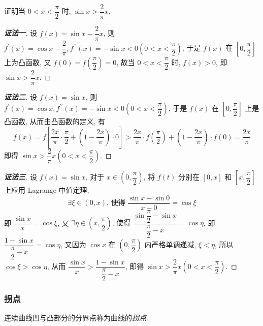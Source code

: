 \begin{example}
    证明当 $0<x<\dfrac{\pi}{2}$ 时, $\sin x>\dfrac{2}{\pi}x.$
\end{example}
\begin{proof}[{\songti \textbf{证法一}}]
    设 $ f(x)=\sin x-\dfrac{2}{\pi} x$, 则 $ f^{\prime}(x)=\cos x-\dfrac{2}{\pi}, f^{\prime \prime}(x)=-\sin x<0\left(0<x<\dfrac{\pi}{2}\right)$, 于是
    $f(x) $ 在 $ \left[0, \dfrac{\pi}{2}\right] $ 上为凸函数, 又 $ f(0)=f\left(\dfrac{\pi}{2}\right)=0$, 故当 $ 0<x<\dfrac{\pi}{2} $ 时, $f(x)>0$, 即 $ \sin x>\dfrac{2}{\pi} x. $
\end{proof}
\begin{proof}[{\songti \textbf{证法二}}]
    设 $ f(x)=\sin x$, 则 $ f^{\prime}(x)=\cos x, f^{\prime \prime}(x)=-\sin x<0\left(0<x<\dfrac{\pi}{2}\right)$, 
    于是 $ f(x) $ 在 $ \left[0, \dfrac{\pi}{2}\right] $ 上是凸函数, 从而由凸函数的定义, 有
    $$f(x)=f\left[\dfrac{2 x}{\pi} \cdot \dfrac{\pi}{2}+\left(1-\dfrac{2 x}{\pi}\right) \cdot 0\right]>\dfrac{2 x}{\pi} \cdot f\left(\dfrac{\pi}{2}\right)+\left(1-\dfrac{2 x}{\pi}\right) \cdot f(0)=\dfrac{2 x}{\pi}$$
    即得 $ \sin x>\dfrac{2}{\pi} x\left(0<x<\dfrac{\pi}{2}\right) .$
\end{proof}
\begin{proof}[{\songti \textbf{证法三}}]
    设 $ f(x)=\sin x$, 对于 $ x \in\left(0, \dfrac{\pi}{2}\right)$, 将 $ f(t) $ 分别在 $ [0, x] $ 和 $ \left[x, \dfrac{\pi}{2}\right] $ 上应用 Lagrange 中值定理, 
    $$\exists\xi \in(0, x) \text{, 使得 }\dfrac{\sin x-\sin 0}{x-0}=\cos \xi$$
    即 $ \dfrac{\sin x}{x}=\cos \xi$, 
    又 $\exists\eta \in\left(x, \dfrac{\pi}{2}\right) \text{, 使得 }\dfrac{\sin \dfrac{\pi}{2}-\sin x}{\dfrac{\pi}{2}-x}=\cos \eta$, 
    即 $ \dfrac{1-\sin x}{\dfrac{\pi}{2}-x}=\cos \eta$, 
    又因为 $ \cos x $ 在 $ \left(0, \dfrac{\pi}{2}\right) $ 内严格单调递减, $\xi<\eta$, 所以 $ \cos \xi>\cos \eta$, 
    从而 $ \dfrac{\sin x}{x}>\dfrac{1-\sin x}{\dfrac{\pi}{2}-x}$, 即得 $ \sin x>\dfrac{2}{\pi} x\left(0<x<\dfrac{\pi}{2}\right) .$
\end{proof}

\subsubsection{拐点}

\begin{definition}[拐点]
    连续曲线凹与凸部分的分界点称为曲线的\textit{拐点}.
\end{definition}

